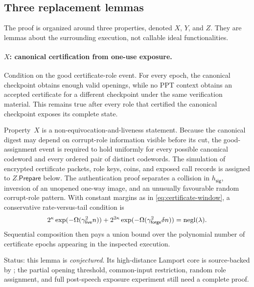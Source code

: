 \subsection{Three replacement lemmas}

The proof is organized around three properties, denoted $X$, $Y$, and $Z$.
They are lemmas about the surrounding execution, not callable ideal
functionalities.

\paragraph{$X$: canonical certification from one-use exposure.}
Condition on the good certificate-role event.  For every epoch, the canonical
checkpoint obtains enough valid openings, while no PPT context obtains an
accepted certificate for a different checkpoint under the same verification
material.  This remains true after every role that certified the canonical
checkpoint exposes its complete state.

Property~$X$ is a non-equivocation-and-liveness statement.  Because the
canonical digest may depend on corrupt-role information visible before its
cut, the good-assignment event is required to hold uniformly for every
possible canonical codeword and every ordered pair of distinct codewords.
The simulation of encrypted certificate packets, role keys, coins, and
exposed call records is
assigned to $Z.\mathsf{Prepare}$ below.  The authentication proof separates a
collision in $h_{\mathsf{sig}}$, inversion of an unopened one-way image, and
an unusually favourable random corrupt-role pattern.  With constant margins
as in \eqref{eq:certificate-window}, a conservative rate-versus-tail
condition is
\[
  2^{\kappa}\exp(-\Omega(\gamma_{\mathsf{live}}^2 n))
  +2^{2\kappa}\exp(-\Omega(
      \gamma_{\mathsf{forge}}^2\delta n))=\mathop{\mathrm{negl}}(\lambda).
\]
Sequential composition then pays a union bound over the polynomial number of
certificate epochs appearing in the inspected execution.

Status: this lemma is \emph{conjectured}.  Its high-distance Lamport core is
source-backed by \cite{KatzVaikuntanathan2009LeakageSignatures}; the partial
opening threshold, common-input restriction, random role assignment, and full
post-speech exposure experiment still need a complete proof.


